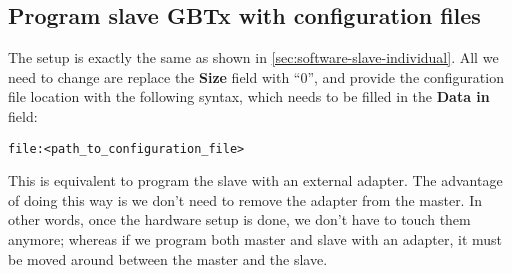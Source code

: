 \subsection{Program slave GBTx with configuration files}
The setup is exactly the same as shown in
\autoref{sec:software-slave-individual}.
All we need to change are replace the \textbf{Size} field with ``0'', and
provide the configuration file location with the following syntax, which needs
to be filled in the \textbf{Data in} field:

\begin{verbatim}
file:<path_to_configuration_file>
\end{verbatim}

\begin{leftbar}
    This is equivalent to program the slave with an external \itwoc adapter.
    The advantage of doing this way is we don't need to remove the \itwoc
    adapter from the master.
    In other words, once the hardware setup is done, we don't have to touch them
    anymore; whereas if we program both master and slave with an \itwoc adapter,
    it must be moved around between the master and the slave.
\end{leftbar}
